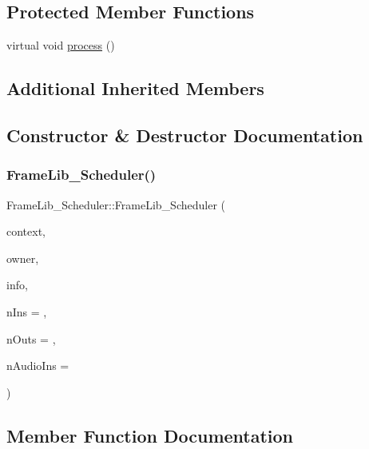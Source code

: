 \subsection*{Protected Member Functions}
\begin{DoxyCompactItemize}
\item 
virtual void \hyperlink{class_frame_lib___scheduler_aa5c10907d7d11e1beef86d19b8e93601}{process} ()
\end{DoxyCompactItemize}
\subsection*{Additional Inherited Members}


\subsection{Constructor \& Destructor Documentation}
\mbox{\label{class_frame_lib___scheduler_adf967edcf371c60833c9c4dfb0daff1a}} 
\subsubsection{\texorpdfstring{Frame\+Lib\+\_\+\+Scheduler()}{FrameLib\_Scheduler()}}
{\footnotesize\ttfamily Frame\+Lib\+\_\+\+Scheduler\+::\+Frame\+Lib\+\_\+\+Scheduler (\begin{DoxyParamCaption}\item[{\hyperlink{class_frame_lib___context}{Frame\+Lib\+\_\+\+Context}}]{context,  }\item[{void $\ast$}]{owner,  }\item[{\hyperlink{class_frame_lib___parameters_1_1_info}{Frame\+Lib\+\_\+\+Parameters\+::\+Info} $\ast$}]{info,  }\item[{unsigned long}]{n\+Ins = {},  }\item[{unsigned long}]{n\+Outs = {},  }\item[{unsigned long}]{n\+Audio\+Ins = {} }\end{DoxyParamCaption})\hspace{0.3cm}{\ttfamily [inline]}}



\subsection{Member Function Documentation}
\mbox{\label{class_frame_lib___scheduler_a7d93c185e4d7b2d13852dad251dc769b}} 
